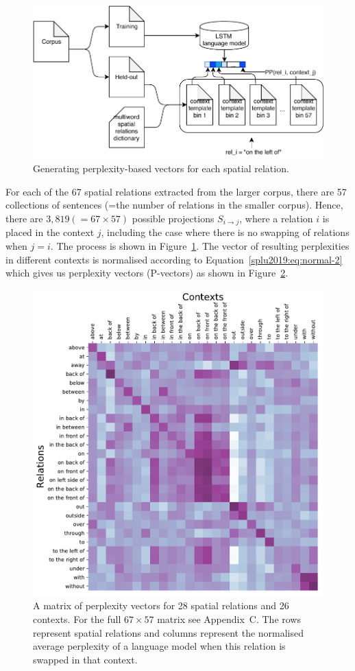 \begin{figure}
  \begin{center}
  \includegraphics[width=0.75\linewidth]{studies/splu2019/figures/Spatial_Emb_Diagram.pdf}
  \caption{Generating perplexity-based vectors for each spatial relation.}\label{splu2019:fig:diagram}
  \end{center}
\end{figure}

For each of the 67 spatial relations extracted from the larger corpus, there
are 57  collections of sentences (=the number of relations in the smaller
corpus).
Hence, there are
$3,819 (= 67 \times 57)$ possible projections $S_{i \to j}$, where a relation
$i$ is placed in the context $j$, including the case where there is no swapping of relations when $j=i$.  The process is shown in
Figure~\ref{splu2019:fig:diagram}. The vector of resulting perplexities in different
contexts is normalised according to Equation~\ref{splu2019:eq:normal-2} which gives us
perplexity vectors (P-vectors) as shown in Figure~\ref{splu2019:fig:matrix28x26}.

\begin{figure}[ht]
  \begin{center}
  \includegraphics[width=0.75\columnwidth]{studies/splu2019/figures/overall_matrix28x26.pdf}
  \caption{A matrix of perplexity vectors for 28 spatial relations and 26 contexts. For the full $67\times 57$ matrix see %
Appendix~C. The rows represent spatial relations and columns represent the normalised average perplexity of a language model when this relation is swapped in that context.}\label{splu2019:fig:matrix28x26}
  \end{center}
\end{figure}

